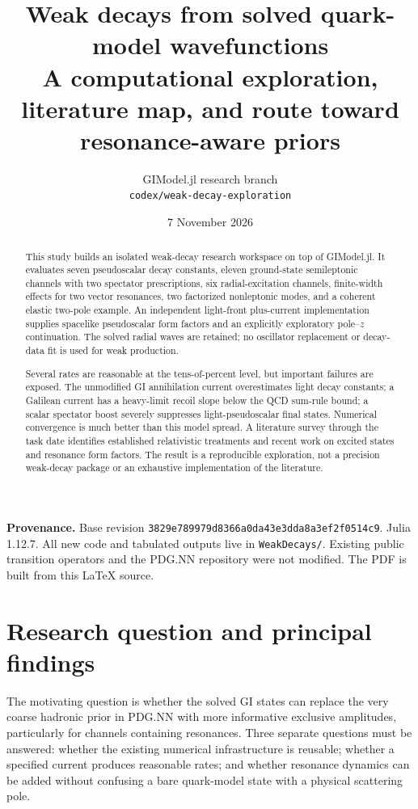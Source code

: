 \documentclass[11pt,a4paper]{article}
\title{\color{ink}\textbf{Weak decays from solved quark-model wavefunctions}\\[5mm]\large A computational exploration, literature map, and route toward resonance-aware priors}
\author{GIModel.jl research branch\\\small\texttt{codex/weak-decay-exploration}}
\date{7 November 2026}
\begin{document}
\maketitle
\begin{abstract}
This study builds an isolated weak-decay research workspace on top of GIModel.jl. It evaluates seven pseudoscalar decay constants, eleven ground-state semileptonic channels with two spectator prescriptions, six radial-excitation channels, finite-width effects for two vector resonances, two factorized nonleptonic modes, and a coherent elastic two-pole example. An independent light-front plus-current implementation supplies spacelike pseudoscalar form factors and an explicitly exploratory pole--$z$ continuation. The solved radial waves are retained; no oscillator replacement or decay-data fit is used for weak production.

Several rates are reasonable at the tens-of-percent level, but important failures are exposed. The unmodified GI annihilation current overestimates light decay constants; a Galilean current has a heavy-limit recoil slope below the QCD sum-rule bound; a scalar spectator boost severely suppresses light-pseudoscalar final states. Numerical convergence is much better than this model spread. A literature survey through the task date identifies established relativistic treatments and recent work on excited states and resonance form factors. The result is a reproducible exploration, not a precision weak-decay package or an exhaustive implementation of the literature.
\end{abstract}
\vfill
\textbf{Provenance.} Base revision \texttt{3829e789979d8366a0da43e3dda8a3ef2f0514c9}. Julia 1.12.7. All new code and tabulated outputs live in \texttt{WeakDecays/}. Existing public transition operators and the PDG.NN repository were not modified. The PDF is built from this LaTeX source.
\clearpage
{\small\setlength{\parskip}{0pt}\tableofcontents}
\clearpage

\section{Research question and principal findings}
The motivating question is whether the solved GI states can replace the very coarse hadronic prior in PDG.NN with more informative exclusive amplitudes, particularly for channels containing resonances. Three separate questions must be answered: whether the existing numerical infrastructure is reusable; whether a specified current produces reasonable rates; and whether resonance dynamics can be added without confusing a bare quark-model state with a physical scattering pole.
\end{document}
